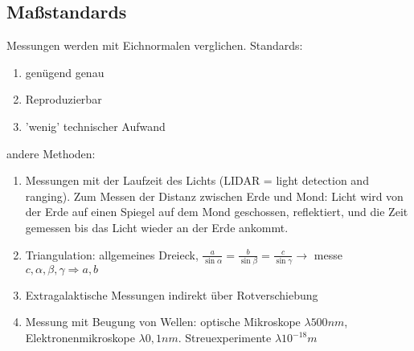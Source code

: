 \documentclass[a4paper,12pt]{article}
\begin{document}
\subsection{Maßstandards}
Messungen werden mit Eichnormalen verglichen. Standards:
\begin{enumerate}[wide,label=$\cdot$]
        \item genügend genau
        \item Reproduzierbar
        \item 'wenig' technischer Aufwand
\end{enumerate}
andere Methoden:
\begin{enumerate}[wide,label=$\cdot$]
        \item Messungen mit der Laufzeit des Lichts (LIDAR = light detection and ranging). Zum Messen der Distanz zwischen Erde und Mond: Licht wird von der Erde auf einen Spiegel auf dem Mond geschossen, reflektiert, und die Zeit gemessen bis das Licht wieder an der Erde ankommt.
        \item Triangulation: allgemeines Dreieck, $\tfrac{a}{\sin \alpha }=\tfrac{b}{\sin \beta}=\tfrac{c}{\sin \gamma } \rightarrow $ messe $c,\alpha,\beta,\gamma \Rightarrow a,b $  
        \item Extragalaktische Messungen indirekt über Rotverschiebung \item Messung mit Beugung von Wellen: optische Mikroskope $\lambda 500nm$, Elektronenmikroskope $\lambda 0,1nm$. Streuexperimente $\lambda 10^{-18}m$ 

\end{enumerate}
\end{document}
